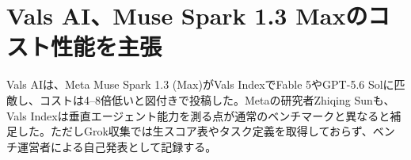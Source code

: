 \section{Vals AI、Muse Spark 1.3 Maxのコスト性能を主張}
Vals AIは、Meta Muse Spark 1.3 (Max)がVals IndexでFable 5やGPT-5.6 Solに匹敵し、コストは4--8倍低いと図付きで投稿した。Metaの研究者Zhiqing Sunも、Vals Indexは垂直エージェント能力を測る点が通常のベンチマークと異なると補足した。ただしGrok収集では生スコア表やタスク定義を取得しておらず、ベンチ運営者による自己発表として記録する。
